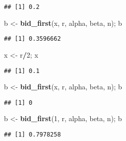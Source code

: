 \documentclass[
]{book}
\newenvironment{Shaded}{\begin{snugshade}}{\end{snugshade}}
\newcommand{\DecValTok}[1]{\textcolor[rgb]{0.00,0.00,0.81}{#1}}
\newcommand{\KeywordTok}[1]{\textcolor[rgb]{0.13,0.29,0.53}{\textbf{#1}}}
\newcommand{\NormalTok}[1]{#1}
\newcommand{\OperatorTok}[1]{\textcolor[rgb]{0.81,0.36,0.00}{\textbf{#1}}}
\newcommand{\StringTok}[1]{\textcolor[rgb]{0.31,0.60,0.02}{#1}}
\begin{document}
\begin{Shaded}
\end{Shaded}

\begin{verbatim}
## [1] 0.2
\end{verbatim}

\begin{Shaded}
\begin{Highlighting}[]
\NormalTok{b <-}\StringTok{ }\KeywordTok{bid_first}\NormalTok{(x, r, alpha, beta, n); b}
\end{Highlighting}
\end{Shaded}

\begin{verbatim}
## [1] 0.3596662
\end{verbatim}

\begin{Shaded}
\begin{Highlighting}[]
\NormalTok{x <-}\StringTok{ }\NormalTok{r}\OperatorTok{/}\DecValTok{2}\NormalTok{; x}
\end{Highlighting}
\end{Shaded}

\begin{verbatim}
## [1] 0.1
\end{verbatim}

\begin{Shaded}
\begin{Highlighting}[]
\NormalTok{b <-}\StringTok{ }\KeywordTok{bid_first}\NormalTok{(x, r, alpha, beta, n); b}
\end{Highlighting}
\end{Shaded}

\begin{verbatim}
## [1] 0
\end{verbatim}

\begin{Shaded}
\begin{Highlighting}[]
\NormalTok{b <-}\StringTok{ }\KeywordTok{bid_first}\NormalTok{(}\DecValTok{1}\NormalTok{, r, alpha, beta, n); b}
\end{Highlighting}
\end{Shaded}

\begin{verbatim}
## [1] 0.7978258
\end{verbatim}
\end{document}
